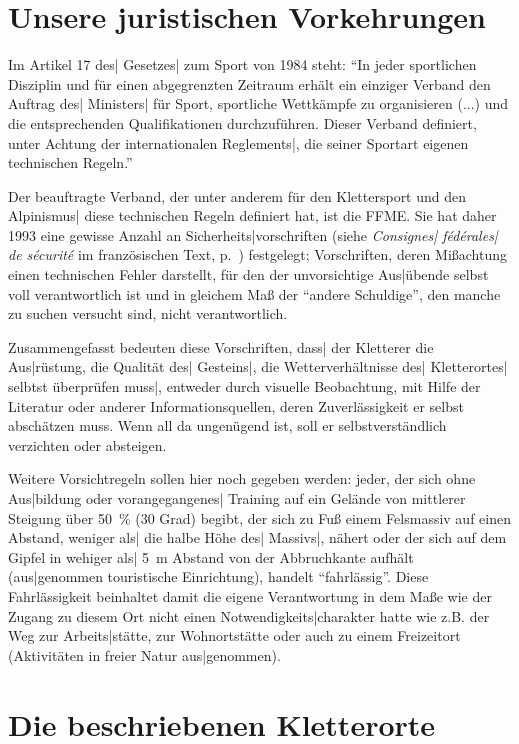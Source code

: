 \documentclass[12pt]{article}
\def\ital#1{{\slshape #1\/}}
\def\3{\ss}
\def\<{``}
\def\>{''}
\def\Pageref{p.~\pageref}
\def\FFME{{\SetCmDefault\rm FFME{}}}
\begin{document}
\section{Unsere juristischen Vorkehrungen}

 Im Artikel 17 des| Gesetzes| zum Sport von 1984 steht: \<In jeder sportlichen
Disziplin und f\"ur einen abgegrenzten Zeitraum erh\"alt ein einziger Verband den
Auftrag des| Ministers| f\"ur Sport, sportliche Wettk\"ampfe zu organisieren (...)
und die entsprechenden Qualifikationen durchzuf\"uhren. Dieser Verband
definiert, unter Achtung der internationalen Reglements|, die seiner Sportart
eigenen technischen Regeln.\>
   
 Der beauftragte Verband, der unter anderem f\"ur den Klettersport und den
Alpinismus| diese technischen Regeln definiert hat, ist die \FFME. Sie hat daher
1993 eine gewisse Anzahl an Sicherheits|vorschriften  (siehe \ital{Consignes|
f\'ed\'erales| de s\'ecurit\'e} im franz\"osischen Text, \Pageref{consfede})
festgelegt; Vorschriften, deren  Mi\3achtung einen technischen Fehler
darstellt, f\"ur den der unvorsichtige Aus|\"ubende selbst voll verantwortlich
ist und in gleichem Ma\3 der \<andere Schuldige\>, den manche zu suchen versucht
sind, nicht verantwortlich.

 Zusammengefasst bedeuten diese Vorschriften, das{}s| der Kletterer die
Aus|r\"ustung, die Qualit\"at des| Gesteins|, die Wetterverh\"altnisse des|
Kletterortes| selbtst \"uberpr\"ufen mus{}s|, entweder durch visuelle Beobachtung,
mit Hilfe der Literatur oder anderer Informationsquellen, deren
Zuverl\"assigkeit er selbst absch\"atzen muss. Wenn all da ungen\"ugend ist,
soll er selbstverst\"andlich verzichten oder absteigen.

 Weitere Vorsichtregeln sollen hier noch gegeben werden: jeder, der sich ohne
Aus|bildung oder vorangegangenes| Training auf ein Gel\"ande von mittlerer
Steigung \"uber 50~\% (30 Grad) begibt, der sich zu Fu\3 einem Felsmassiv auf
einen Abstand, weniger als| die halbe H\"ohe des| Massivs|, n\"ahert oder der sich
auf dem Gipfel in wehiger als| 5~m Abstand von der Abbruchkante aufh\"alt
(aus|genommen touristische Einrichtung), handelt \<fahrl\"assig\>. Diese
Fahrl\"assigkeit beinhaltet damit die eigene Verantwortung in dem Ma\3e wie der
Zugang zu diesem Ort nicht einen Notwendigkeits|charakter hatte wie z.B. der
Weg zur Arbeits|st\"atte, zur Wohnortst\"atte oder auch zu einem Freizeitort
(Aktivit\"aten in freier Natur aus|genommen).


\section{Die beschriebenen Kletterorte}
\end{document}
